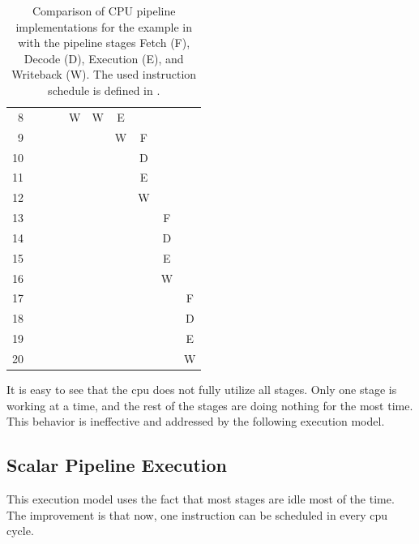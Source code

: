 \begin{table}
{{\begin{tabular}{rccccccccc}
                 8 &   &   &   & W & W & E &   &   &   \\
                 9 &   &   &   &   &   & W & F &   &   \\ \rowcolor[gray]{.975}
                10 &   &   &   &   &   &   & D &   &   \\
                11 &   &   &   &   &   &   & E &   &   \\ \rowcolor[gray]{.975}
                12 &   &   &   &   &   &   & W &   &   \\
                13 &   &   &   &   &   &   &   & F &   \\ \rowcolor[gray]{.975}
                14 &   &   &   &   &   &   &   & D &   \\
                15 &   &   &   &   &   &   &   & E &   \\ \rowcolor[gray]{.975}
                16 &   &   &   &   &   &   &   & W &   \\
                17 &   &   &   &   &   &   &   &   & F \\ \rowcolor[gray]{.975}
                18 &   &   &   &   &   &   &   &   & D \\
                19 &   &   &   &   &   &   &   &   & E \\ \rowcolor[gray]{.975}
                20 &   &   &   &   &   &   &   &   & W \\ 
                \bottomrule
            \end{tabular}
        }
    }
    \caption[Comparison of CPU pipeline implementations]{Comparison of CPU pipeline implementations for the example in  with the pipeline stages Fetch (F), Decode (D), Execution (E), and Writeback (W). 
    The used instruction schedule is defined in .}
    \label{tbl:bg:pipeline}
\end{table}

It is easy to see that the \ac{cpu} does not fully utilize all stages.
Only one stage is working at a time, and the rest of the stages are doing nothing for the most time.
This behavior is ineffective and addressed by the following execution model.

\subsection{Scalar Pipeline Execution}
This execution model uses the fact that most stages are idle most of the time.
The improvement is that now, one instruction can be scheduled in every \ac{cpu} cycle.

